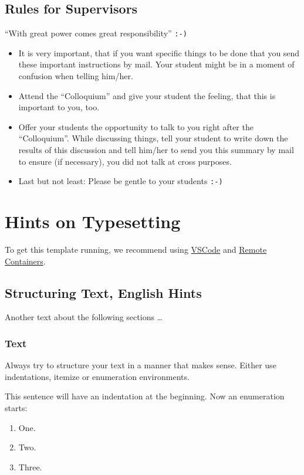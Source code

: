 \subsection{Rules for Supervisors}
\enquote{With great power comes great responsibility} \texttt{:-)}

\begin{itemize}
\item It is very important, that if you want specific things to be done that you send these important instructions by mail. Your student might be in a moment of confusion when telling him/her.
\item Attend the \enquote{Colloquium} and give your student the feeling, that this is important to you, too.
\item Offer your students the opportunity to talk to you right after the \enquote{Colloquium}. While discussing things, tell your student to write down the results of this discussion and tell him/her to send you this summary by mail to ensure (if necessary), you did not talk at cross purposes.
\item Last but not least: Please be gentle to your students \texttt{:-)}
\end{itemize}

\section{Hints on Typesetting}
To get this template running, we recommend using \href{https://code.visualstudio.com/download}{VSCode} and \href{https://code.visualstudio.com/docs/devcontainers/tutorial}{Remote Containers}.

\subsection{Structuring Text, English Hints}
Another text about the following sections \dots

\subsubsection{Text }
Always try to structure your text in a manner that makes sense. Either use indentations, itemize or enumeration environments.

This sentence will have an indentation at the beginning. Now an enumeration starts:

\begin{enumerate}
\item One.
\item Two.
\item Three.
\end{enumerate}

